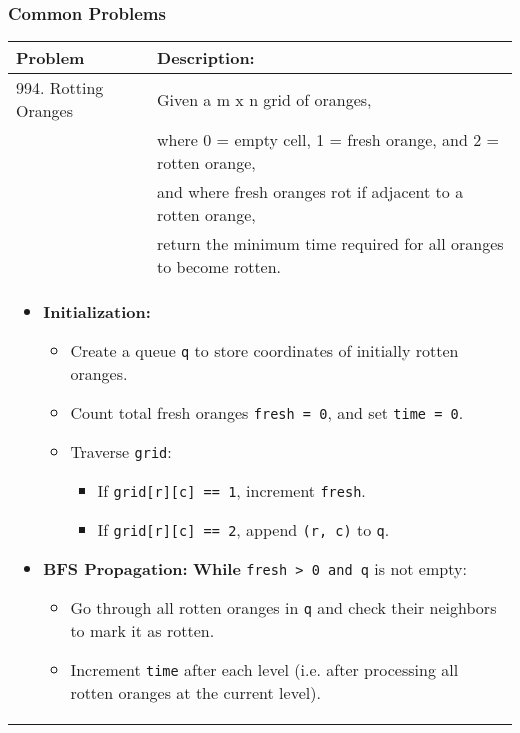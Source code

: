 \subsubsection{Common Problems}
\begin{summary}
    \begin{center}
        \begin{tabular}{ll}
            \toprule
            \textbf{Problem} & \textbf{Description:} \\
            \midrule
            994. Rotting Oranges & Given a m x n grid of oranges, \\
            & where 0 = empty cell, 1 = fresh orange, and 2 = rotten orange, \\
            & and where fresh oranges rot if adjacent to a rotten orange, \\
            & return the minimum time required for all oranges to become rotten. \\
            \multicolumn{2}{p{\linewidth}}{
                \begin{itemize}
                    \item \textbf{Initialization:}
                    \begin{itemize}
                        \item Create a queue \texttt{q} to store coordinates of initially rotten oranges.
                        \item Count total fresh oranges \texttt{fresh = 0}, and set \texttt{time = 0}.
                        \item Traverse \texttt{grid}:
                        \begin{itemize}
                            \item If \texttt{grid[r][c] == 1}, increment \texttt{fresh}.
                            \item If \texttt{grid[r][c] == 2}, append \texttt{(r, c)} to \texttt{q}.
                        \end{itemize}
                    \end{itemize}
                    \item \textbf{BFS Propagation:} \textbf{While} \texttt{fresh > 0 and q} is not empty:
                    \begin{itemize}
                        \item Go through all rotten oranges in \texttt{q} and check their neighbors to mark it as rotten.
                        \item Increment \texttt{time} after each level (i.e. after processing all rotten oranges at the current level).

\end{itemize}
\end{itemize}}
\end{tabular}
\end{center}
\end{summary}
